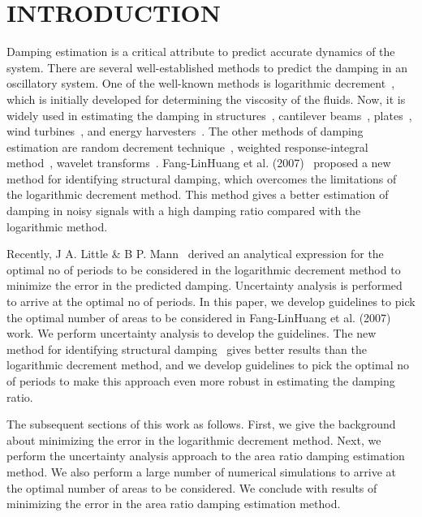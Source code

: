 \section{INTRODUCTION} \label{sec:intro}
Damping estimation is a critical attribute to predict accurate dynamics of the system. There are several well-established methods to predict the damping in an oscillatory system. One of the well-known methods is logarithmic decrement~\cite{1890a}, which is initially developed for determining the viscosity of the fluids. Now, it is widely used in estimating the damping in structures~\cite{Fang1996}, cantilever beams~\cite{Liao2011}, plates~\cite{Saito1982}, wind turbines~\cite{Hansen2006}, and energy harvesters~\cite{Stanton2010}. The other methods of damping estimation are random decrement technique~\cite{Ibrahim1977}, weighted response-integral method~\cite{GAYLARD2001}, wavelet transforms~\cite{Ahmed2016}. Fang-LinHuang et al. (2007)~\cite{Huang2007} proposed a new method for identifying structural damping, which overcomes the limitations of the logarithmic decrement method. This method gives a better estimation of damping in noisy signals with a high damping ratio compared with the logarithmic method.

Recently, J A. Little \& B P. Mann~\cite{Little2019} derived an analytical expression for the optimal no of periods to be considered in the logarithmic decrement method to minimize the error in the predicted damping. Uncertainty analysis is performed to arrive at the optimal no of periods. In this paper, we develop guidelines to pick the optimal number of areas to be considered in Fang-LinHuang et al. (2007)~\cite{Huang2007} work. We perform uncertainty analysis to develop the guidelines. The new method for identifying structural damping~\cite{Huang2007} gives better results than the logarithmic decrement method, and we develop guidelines to pick the optimal no of periods to make this approach even more robust in estimating the damping ratio.

The subsequent sections of this work as follows. First, we give the background about minimizing the error in the logarithmic decrement method. Next, we perform the uncertainty analysis approach to the area ratio damping estimation method. We also perform a large number of numerical simulations to arrive at the optimal number of areas to be considered. We conclude with results of minimizing the error in the area ratio damping estimation method.